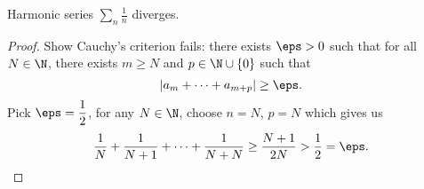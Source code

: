 \begin{example}
	Harmonic series \(\displaystyle\sum_n\frac{1}{n}\) diverges.
	\begin{proof}
		Show Cauchy's criterion fails: there exists \(\eps>0\) such that for all \(N\in\N\), there exists \(m\geq N\) and \(p\in\N\cup\{0\}\) such that 
		\begin{equation*}
		|a_m+\dots+a_{m+p}|\geq\eps.
		\end{equation*}
		Pick \(\eps=\displaystyle\frac{1}{2}\), for any \(N\in\N\), choose \(n=N\), \(p=N\) which gives us 
		\begin{equation*}
			\frac{1}{N}+\frac{1}{N+1}+\dots+\frac{1}{N+N}\geq \frac{N+1}{2N}>\frac{1}{2}=\eps.
		\end{equation*}
	\end{proof}
\end{example}